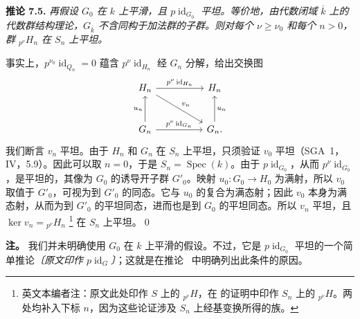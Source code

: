 
\medskip
\noindent{}\textbf{推论 7.5.}
\textit{再假设 \(G_0\) 在 \(k\) 上平滑，且 \(p\operatorname{id}_{G_0}\) 平坦。等价地，由代数闭域 \(\overline{k}\) 上的代数群结构理论，\(G_{\overline{k}}\) 不含同构于加法群的子群。则对每个 \(\nu\geq\nu_0\) 和每个 \(n>0\)，群 \({}_{p^\nu}H_n\) 在 \(S_n\) 上平坦。}

事实上，\(p^{\nu_0}\operatorname{id}_{Q_n}=0\) 蕴含 \(p^\nu\operatorname{id}_{H_n}\) 经 \(G_n\) 分解，给出交换图
\[
\begin{tikzcd}[column sep=huge,row sep=large]
H_n
  \arrow[r,"p^\nu\operatorname{id}_{H_n}"]
  \arrow[dr,"v_n"]
&
H_n
\\
G_n
  \arrow[u,"u_n"]
  \arrow[r,"p^\nu\operatorname{id}_{G_n}"]
&
G_n
  \arrow[u,"u_n"']
.
\end{tikzcd}
\]
我们断言 \(v_n\) 平坦。由于 \(H_n\) 和 \(G_n\) 在 \(S_n\) 上平坦，只须验证 \(v_0\) 平坦（SGA~1，IV，5.9）。因此可以取 \(n=0\)，于是 \(S_n=\operatorname{Spec}(k)\)。由于 \(p\operatorname{id}_{G_0}\)，从而 \(p^\nu\operatorname{id}_{G_0}\)，是平坦的，其像为 \(G_0\) 的诱导开子群 \(G'_0\)。映射 \(u_0:G_0\to H_0\) 为满射，所以 \(v_0\) 取值于 \(G'_0\)，可视为到 \(G'_0\) 的同态。它与 \(u_0\) 的复合为满态射；因此 \(v_0\) 本身为满态射，从而为到 \(G'_0\) 的平坦同态，进而也是到 \(G_0\) 的平坦同态。所以 \(v_n\) 平坦，且
\(\ker v_n={}_{p^\nu}H_n\)%
\begingroup
\renewcommand{\thefootnote}{\(\dagger\)}
\footnote[0]{英文本编者注：原文此处印作 \(S\) 上的 \({}_{p^\nu}H\)，在 的证明中印作 \(S_n\) 上的 \({}_{p^\nu}H\)。两处均补入下标 \(n\)，因为这些论证涉及 \(S_n\) 上经基变换所得的族。}
\endgroup
在 \(S_n\) 上平坦。\qed

\medskip
\noindent{}\textbf{注。}
我们并未明确使用 \(G_0\) 在 \(k\) 上平滑的假设。不过，它是
\(p\operatorname{id}_{G_0}\)
平坦的一个简单推论\emph{〔原文印作 \(p\operatorname{id}_{G}\)〕}；这就是在推论~ 中明确列出此条件的原因。

